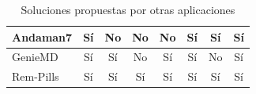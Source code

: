 \begin{table}[H]
{\begin{tabular}{|l|c|c|c|c|c|c|c|}
		Andaman7                         & Sí              & No                                                                         & No                                                                            & No                                                                      & Sí                                                           & Sí                                                                    & Sí                                                                 \\ \hline
		GenieMD                          & Sí              & Sí                                                                         & No                                                                            & Sí                                                                      & Sí                                                           & No                                                                    & Sí                                                                 \\ \hline
		Rem-Pills                          & Sí              & Sí                                                                         & Sí                                                                            & Sí                                                                      & Sí                                                           & Sí                                                                    & Sí                                                                 \\ \hline
	\end{tabular}
	}
\caption{Soluciones propuestas por otras aplicaciones}
\label{SolucionesProp}
\end{table}

